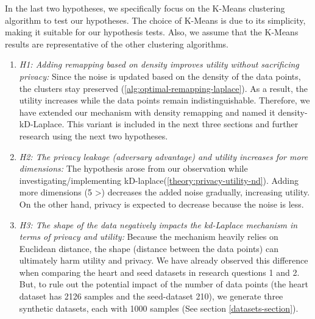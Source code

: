 \begin{enumerate}
        In the last two hypotheses, we specifically focus on the K-Means clustering algorithm to test our hypotheses.
        The choice of K-Means is due to its simplicity, making it suitable for our hypothesis tests.
        Also, we assume that the K-Means results are representative of the other clustering algorithms.
        \begin{enumerate}
          \item \textit{H1: Adding remapping based on density improves utility without sacrificing privacy:}
                Since the noise is updated based on the density of the data points, the clusters stay preserved (\ref{alg:optimal-remapping-laplace}).
                As a result, the utility increases while the data points remain indistinguishable.
                Therefore, we have extended our mechanism with density remapping and named it density-kD-Laplace.
                This variant is included in the next three sections and further research using the next two hypotheses.
          \item \textit{H2: The privacy leakage (adversary advantage) and utility increases for more dimensions:}
                The hypothesis arose from our observation while investigating/implementing kD-laplace(\ref{theory:privacy-utility-nd}).
                Adding more dimensions (5 >) decreases the added noise gradually, increasing utility.
                On the other hand, privacy is expected to decrease because the noise is less.
          \item \textit{H3: The shape of the data negatively impacts the kd-Laplace mechanism in terms of privacy and utility:}
                Because the mechanism heavily relies on Euclidean distance, the shape (distance between the data points) can ultimately harm utility and privacy.
                We have already observed this difference when comparing the heart and seed datasets in research questions 1 and 2.
                But, to rule out the potential impact of the number of data points (the heart dataset has 2126 samples and the seed-dataset 210), we generate three synthetic datasets, each with 1000 samples (See section \ref{datasets-section}).
        \end{enumerate}
\end{enumerate}

